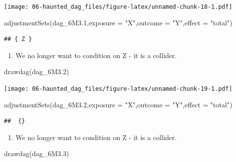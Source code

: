 \documentclass[
]{book}
\newenvironment{Shaded}{\begin{snugshade}}{\end{snugshade}}
\newcommand{\AttributeTok}[1]{\textcolor[rgb]{0.77,0.63,0.00}{#1}}
\newcommand{\FloatTok}[1]{\textcolor[rgb]{0.00,0.00,0.81}{#1}}
\newcommand{\FunctionTok}[1]{\textcolor[rgb]{0.00,0.00,0.00}{#1}}
\newcommand{\NormalTok}[1]{#1}
\newcommand{\StringTok}[1]{\textcolor[rgb]{0.31,0.60,0.02}{#1}}
\providecommand{\tightlist}{%
  \setlength{\itemsep}{0pt}\setlength{\parskip}{0pt}}
\begin{document}
\texttt{[image: 06-haunted\_dag\_files/figure-latex/unnamed-chunk-18-1.pdf]}

\begin{Shaded}
\begin{Highlighting}[]
\FunctionTok{adjustmentSets}\NormalTok{(dag\_6M3}\FloatTok{.1}\NormalTok{,}\AttributeTok{exposure =} \StringTok{"X"}\NormalTok{,}\AttributeTok{outcome =} \StringTok{"Y"}\NormalTok{,}\AttributeTok{effect =} \StringTok{"total"}\NormalTok{)}
\end{Highlighting}
\end{Shaded}

\begin{verbatim}
## { Z }
\end{verbatim}

\begin{enumerate}
\def\labelenumi{\arabic{enumi}.}
\setcounter{enumi}{1}
\tightlist
\item
  We no longer want to condition on Z - it is a collider.
\end{enumerate}

\begin{Shaded}
\begin{Highlighting}[]
\FunctionTok{drawdag}\NormalTok{(dag\_6M3}\FloatTok{.2}\NormalTok{)}
\end{Highlighting}
\end{Shaded}

\texttt{[image: 06-haunted\_dag\_files/figure-latex/unnamed-chunk-19-1.pdf]}

\begin{Shaded}
\begin{Highlighting}[]
\FunctionTok{adjustmentSets}\NormalTok{(dag\_6M3}\FloatTok{.2}\NormalTok{,}\AttributeTok{exposure =} \StringTok{"X"}\NormalTok{,}\AttributeTok{outcome =} \StringTok{"Y"}\NormalTok{,}\AttributeTok{effect =} \StringTok{"total"}\NormalTok{)}
\end{Highlighting}
\end{Shaded}

\begin{verbatim}
##  {}
\end{verbatim}

\begin{enumerate}
\def\labelenumi{\arabic{enumi}.}
\setcounter{enumi}{2}
\tightlist
\item
  We no longer want to condition on Z - it is a collider.
\end{enumerate}

\begin{Shaded}
\begin{Highlighting}[]
\FunctionTok{drawdag}\NormalTok{(dag\_6M3}\FloatTok{.3}\NormalTok{)}
\end{Highlighting}
\end{Shaded}
\end{document}
